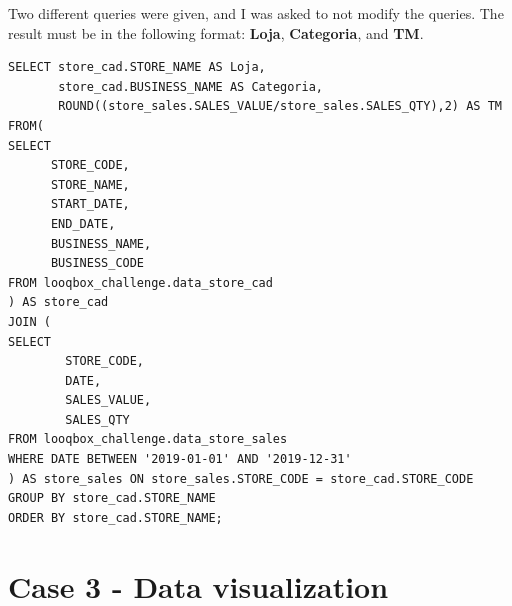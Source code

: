 \documentclass[a4paper, 12pt]{article}
\begin{document}
Two different queries were given, and I was asked to not modify the queries. The result must be in the following format: \textbf{Loja}, \textbf{Categoria}, and \textbf{TM}. 

\begin{verbatim}
SELECT store_cad.STORE_NAME AS Loja, 
       store_cad.BUSINESS_NAME AS Categoria, 
       ROUND((store_sales.SALES_VALUE/store_sales.SALES_QTY),2) AS TM
FROM(
SELECT
      STORE_CODE,
      STORE_NAME,
      START_DATE,
      END_DATE,
      BUSINESS_NAME,
      BUSINESS_CODE
FROM looqbox_challenge.data_store_cad
) AS store_cad
JOIN (
SELECT
        STORE_CODE,
        DATE,
        SALES_VALUE,
        SALES_QTY
FROM looqbox_challenge.data_store_sales
WHERE DATE BETWEEN '2019-01-01' AND '2019-12-31'
) AS store_sales ON store_sales.STORE_CODE = store_cad.STORE_CODE
GROUP BY store_cad.STORE_NAME
ORDER BY store_cad.STORE_NAME;
\end{verbatim}


\newpage
\section{Case 3 - Data visualization}


\newpage
\end{document}

